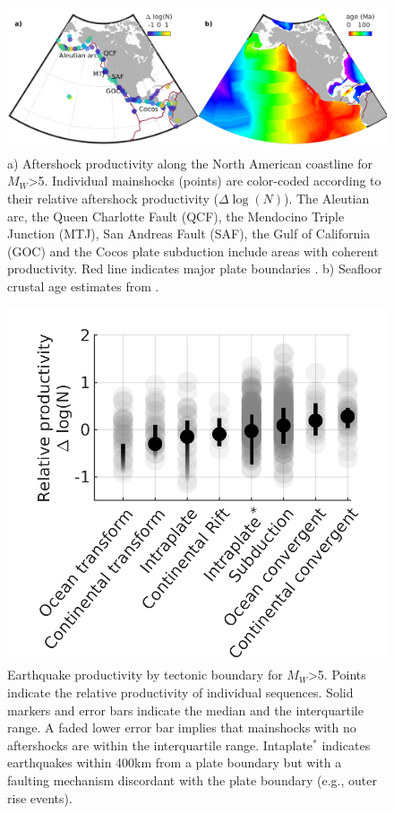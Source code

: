 \documentclass[draft]{agujournal}
\begin{document}
\begin{figure}
\centering
\includegraphics[]{figures/regions_mw5.png}
\caption{a) Aftershock productivity along the North American coastline for $M_W$>5.  Individual mainshocks (points) are color-coded according to their relative aftershock productivity ($\Delta \log(N)$). The Aleutian arc, the Queen Charlotte Fault (QCF), the Mendocino Triple Junction (MTJ), San Andreas Fault (SAF), the Gulf of California (GOC) and the Cocos plate subduction include areas with coherent productivity. Red line indicates major plate boundaries \citep{Bird2003AnBoundaries}. b) Seafloor crustal age estimates from \citet{Muller2008}.}
\label{fig:region}
\end{figure}  

\begin{figure}
\centering
\includegraphics{figures/prod_by_pb_mw5.png}
\caption{Earthquake productivity by tectonic boundary for $M_W$>5. Points indicate the relative productivity of individual sequences. Solid markers and error bars indicate the median and the interquartile range. A faded lower error bar implies that mainshocks with no aftershocks are within the interquartile range. Intaplate$^*$ indicates earthquakes within 400km from a plate boundary but with a faulting mechanism discordant with the plate boundary (e.g., outer rise events).}
\label{fig:plate_boundary}
\end{figure}    
\end{document}
